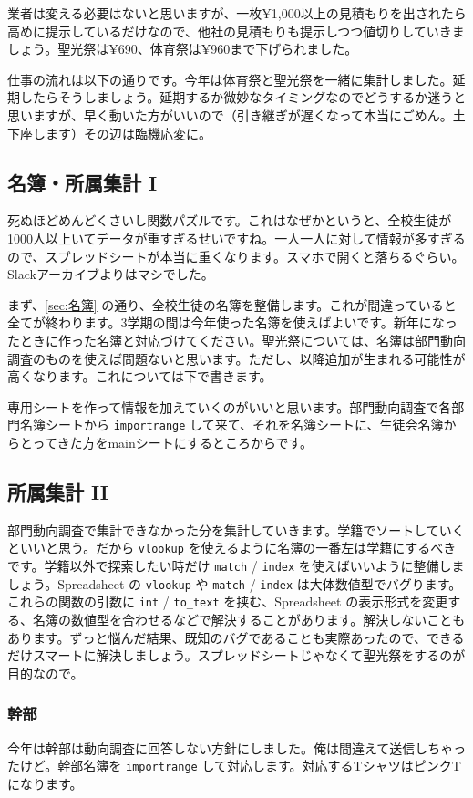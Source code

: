 \documentclass[a4paper]{ltjsreport}
\begin{document}
業者は変える必要はないと思いますが、一枚¥1,000以上の見積もりを出されたら高めに提示しているだけなので、他社の見積もりも提示しつつ値切りしていきましょう。聖光祭は¥690、体育祭は¥960まで下げられました。

仕事の流れは以下の通りです。今年は体育祭と聖光祭を一緒に集計しました。延期したらそうしましょう。延期するか微妙なタイミングなのでどうするか迷うと思いますが、早く動いた方がいいので（引き継ぎが遅くなって本当にごめん。土下座します）その辺は臨機応変に。

\subsection{名簿・所属集計 I}
死ぬほどめんどくさいし関数パズルです。これはなぜかというと、全校生徒が1000人以上いてデータが重すぎるせいですね。一人一人に対して情報が多すぎるので、スプレッドシートが本当に重くなります。スマホで開くと落ちるぐらい。Slackアーカイブよりはマシでした。

まず、\ref{sec:名簿} の通り、全校生徒の名簿を整備します。これが間違っていると全てが終わります。3学期の間は今年使った名簿を使えばよいです。新年になったときに作った名簿と対応づけてください。聖光祭については、名簿は部門動向調査のものを使えば問題ないと思います。ただし、以降追加が生まれる可能性が高くなります。これについては下で書きます。

専用シートを作って情報を加えていくのがいいと思います。部門動向調査で各部門名簿シートから \texttt{importrange} して来て、それを名簿シートに、生徒会名簿からとってきた方をmainシートにするところからです。

\subsection{所属集計 II}
部門動向調査で集計できなかった分を集計していきます。学籍でソートしていくといいと思う。だから \texttt{vlookup} を使えるように名簿の一番左は学籍にするべきです。学籍以外で探索したい時だけ \texttt{match} / \texttt{index} を使えばいいように整備しましょう。Spreadsheet の \texttt{vlookup} や \texttt{match} / \texttt{index} は大体数値型でバグります。これらの関数の引数に \texttt{int} / \texttt{to\_text} を挟む、Spreadsheet の表示形式を変更する、名簿の数値型を合わせるなどで解決することがあります。解決しないこともあります。ずっと悩んだ結果、既知のバグであることも実際あったので、できるだけスマートに解決しましょう。スプレッドシートじゃなくて聖光祭をするのが目的なので。

\subsubsection{幹部}
今年は幹部は動向調査に回答しない方針にしました。俺は間違えて送信しちゃったけど。幹部名簿を \texttt{importrange} して対応します。対応するTシャツはピンクTになります。
\end{document}
